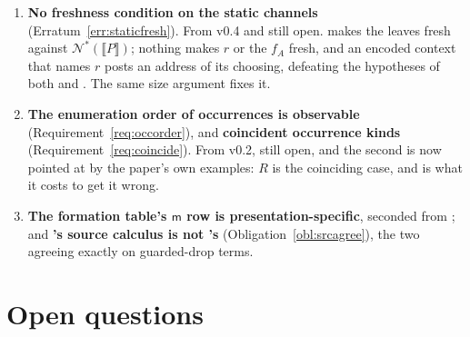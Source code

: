 \documentclass[11pt,a4paper]{article}
\newcommand{\enc}[1]{\llbracket #1 \rrbracket}
\newcommand{\nms}[1]{\mathcal{N}^{*}(#1)}
\newcommand{\mm}{\mathsf{m}}
\theoremstyle{definition}
\theoremstyle{plain}
\begin{document}
\begin{enumerate}[leftmargin=1.8em]
\item \textbf{No freshness condition on the static channels}
(Erratum~\ref{err:staticfresh}). From v0.4 and still open.
\cite[Lem.~6.14]{draft3} makes the leaves fresh against $\nms{\enc{P}}$;
nothing makes $r$ or the $f_{A}$ fresh, and an encoded context that names $r$
posts an address of its choosing, defeating the hypotheses of both
\cite[Lem.~6.11]{draft3} and \cite[Lem.~6.14]{draft3}. The same size argument
fixes it.

\item \textbf{The enumeration order of occurrences is observable}
(Requirement~\ref{req:occorder}), and \textbf{coincident occurrence kinds}
(Requirement~\ref{req:coincide}). From v0.2, still open, and the second is now
pointed at by the paper's own examples: $R$ is the coinciding case, and
\cite[Ex.~6.21]{draft3} is what it costs to get it wrong.

\item \textbf{The formation table's $\mm$ row is presentation-specific},
seconded from \cite[Rem.~2.6]{logic}; and \textbf{\cite[\S2]{draft3}'s source
calculus is not \cite[Def.~2.6]{k1ndl1ng}'s}
(Obligation~\ref{obl:srcagree}), the two agreeing exactly on guarded-drop
terms.

\end{enumerate}

\section{Open questions}
\end{document}
